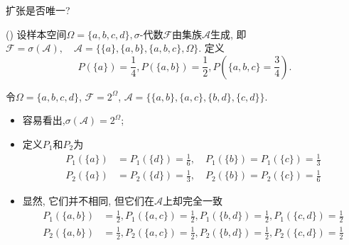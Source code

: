 \begin{frame}{扩张是否唯一?}
\begin{exam}
() 设样本空间${\Omega=\{a, b, c, d\}, \sigma}$-代数${\mathcal{F}}$由集族${\mathcal{A}}$生成, 即$\mathcal{F}=\sigma(\mathcal{A}), \quad  \mathcal{A}=\{\{a\},\{a, b\},\{a, b, c\}, \Omega\}$. 定义
\[P(\{a\})=\frac{1}{4}, P(\{a,b\})=\frac{1}{2}, P(\{a,b,c\}=\frac{3}{4}).\]
\end{exam}
\pause
\begin{exam}
令$\Omega=\{a, b, c, d\}$, $\mathcal{F}=2^{\Omega}$, $\mathcal{A}=\{\{a, b\},\{a, c\},\{b, d\},\{c, d\}\}$.

\begin{itemize}[<+-|alert@+>]
	\item 容易看出,${\sigma(\mathcal{A})=2^{\Omega}}$;
	\item 定义${P_{1}}$和${P_{2}}$为
	{\small \begin{align*}
		P_{1}(\{a\})&=P_{1}(\{d\})=\frac{1}{6}, \quad  P_{1}(\{b\})=P_{1}(\{c\})=\frac{1}{3} \\
		P_{2}(\{a\})&=P_{2}(\{d\})=\frac{1}{3}, \quad  P_{2}(\{b\})=P_{2}(\{c\})=\frac{1}{6}
	\end{align*}}

	\item 显然, 它们并不相同, 但它们在${\mathcal{A}}$上却完全一致
	{\small \begin{align*}
		P_{1}(\{a, b\})&=\frac{1}{2}, P_{1}(\{a, c\})=\frac{1}{2}, P_{1}(\{b, d\})=\frac{1}{2}, P_{1}(\{c, d\})=\frac{1}{2}\\
		P_{2}(\{a, b\})&=\frac{1}{2}, P_{2}(\{a, c\})=\frac{1}{2}, P_{2}(\{b, d\})=\frac{1}{2}, P_{2}(\{c, d\})=\frac{1}{2}
	\end{align*}}
\end{itemize}


\end{exam}



\end{frame}


